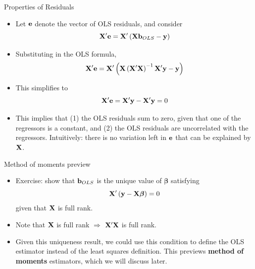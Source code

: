 \begin{frame}{Properties of Residuals}
\begin{itemize}
	\item Let ${\bf e} $ denote the vector of OLS residuals, and consider \[
		{\bf X}' {\bf e} = {\bf X}' \left({\bf X} {\bf b}_{OLS} - {\bf y} \right) 
	\]
	\item Substituting in the OLS formula, 
 \[
		{\bf X}' {\bf e} = {\bf X}' \left({\bf X} \left({\bf X}'{\bf X}\right)^{-1} {\bf X}' {\bf y} - {\bf y} \right) 
	\]

\item This simplifies to 
 \[
		{\bf X}' {\bf e} = {\bf X}' {\bf y} -  {\bf X}' {\bf y}  = 0
	\]

	\item This implies that (1) the OLS residuals sum to zero, given that one of the regressors is a constant, and
	(2) the OLS residuals are uncorrelated with the regressors. Intuitively: there is no variation left in ${\bf e} $
	 that can be explained by ${\bf X}$.
	
\end{itemize}
\end{frame}


\begin{frame}{Method of moments preview}
\begin{itemize}
	\item Exercise: show that ${\bf b}_{OLS}$ is the unique value of $\boldsymbol{\beta}$ satisfying 
	\[
		{\bf X}' \left({\bf y} - {\bf X} \boldsymbol{\beta}  \right) =0
	\]
	given that ${\bf X}$ is full rank.

	\medskip
	\item Note that ${\bf X}$ is full rank $\Rightarrow$ ${\bf X}'{\bf X}$ is full rank.

	\medskip 
	\item Given this uniqueness result, we could use this condition to define the OLS estimator 
	instead of the least squares definition. 
	This previews {\bf method of moments} estimators, which we will discuss later.
	
\end{itemize}
\end{frame}



